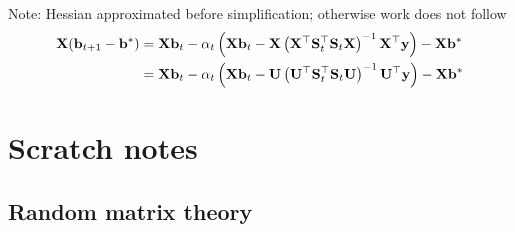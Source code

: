 \documentclass[10pt]{article}
\begin{document}
Note: Hessian approximated before simplification; otherwise work does not follow
\begin{align*}
\mathbf{X}(\mathbf{b}_{t+1}-\mathbf{b}^*) &= \mathbf{X}\mathbf{b}_t - \alpha_t\left(\mathbf{X}\mathbf{b}_t-\mathbf{X}\left(\mathbf{X}^\top\mathbf{S}_t^\top\mathbf{S}_t\mathbf{X}\right)^{-1}\mathbf{X}^\top\mathbf{y}\right) - \mathbf{X}\mathbf{b}^* \\
&= \mathbf{X}\mathbf{b}_t - \alpha_t\left(\mathbf{X}\mathbf{b}_t-\mathbf{U}\left(\mathbf{U}^\top\mathbf{S}_t^\top\mathbf{S}_t\mathbf{U}\right)^{-1}\mathbf{U}^\top\mathbf{y}\right) - \mathbf{X}\mathbf{b}^*
\end{align*}



\newpage



\section{Scratch notes}

\subsection{Random matrix theory}
\end{document}
